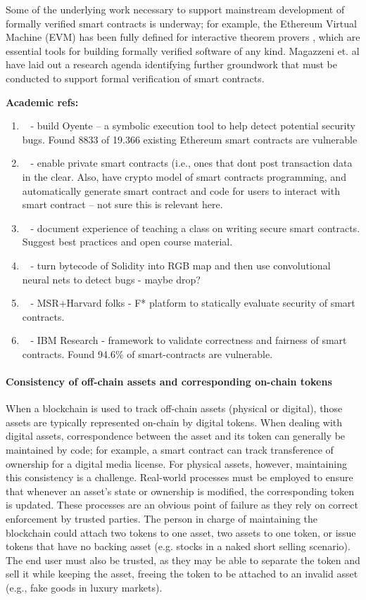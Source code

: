 Some of the underlying work necessary to support mainstream development of formally verified smart contracts is underway; for example, the Ethereum Virtual Machine (EVM) has been fully defined for interactive theorem provers \cite{Hirai17}, which are essential tools for building formally verified software of any kind. Magazzeni et. al \cite{Magazzeni17} have laid out a research agenda identifying further groundwork that must be conducted to support formal verification of smart contracts.

\noindent
\textbf{Academic refs:}
\begin{enumerate}
\item~\cite{CCS:LCOSH16} - build Oyente -- a symbolic execution tool to help detect potential security bugs.  Found 8833 of 19.366 existing Ethereum smart contracts are vulnerable
\item~\cite{SP:KMSWP16} - enable private smart contracts (i.e., ones that dont post transaction data in the clear.  Also, have crypto model of smart contracts programming, and automatically generate smart contract and code for users to interact with smart contract -- not sure this is relevant here.
\item~\cite{FC:DAKMS16} - document experience of teaching a class on writing secure smart contracts.  Suggest best practices and open course material.
\item~\cite{arxiv:Huang18} - turn bytecode of Solidity into RGB map and then use convolutional neural nets to detect bugs - maybe drop?
\item~\cite{CCS:BDFGGK+16} - MSR+Harvard folks - F* platform to statically evaluate security of smart contracts.
\item~\cite{NDSS:KGDS18} - IBM Research - framework to validate correctness and fairness of smart contracts.  Found 94.6\% of smart-contracts are vulnerable.
\end{enumerate}

\paragraph{Consistency of off-chain assets and corresponding on-chain tokens}
When a blockchain is used to track off-chain assets (physical or digital), those assets are typically represented on-chain by digital tokens. When dealing with digital assets, correspondence between the asset and its token can generally be maintained by code; for example, a smart contract can track transference of ownership for a digital media license. For physical assets, however, maintaining this consistency is a challenge. Real-world processes must be employed to ensure that whenever an asset's state or ownership is modified, the corresponding token is updated. These processes are an obvious point of failure as they rely on correct enforcement by trusted parties. The person in charge of maintaining the blockchain could attach two tokens to one asset, two assets to one token, or issue tokens that have no backing asset (e.g. stocks in a naked short selling scenario). The end user must also be trusted, as they may be able to separate the token and sell it while keeping the asset, freeing the token to be attached to an invalid asset (e.g., fake goods in luxury markets). 

